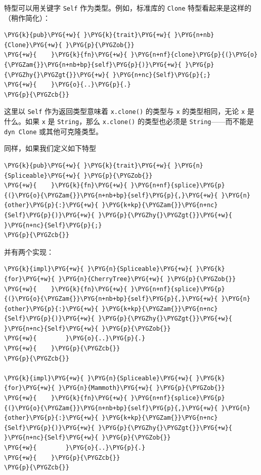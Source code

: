 特型可以用关键字 \texttt{Self} 作为类型。例如，标准库的 \texttt{Clone} 特型看起来是这样的（稍作简化）：

\begin{Verbatim}[commandchars=\\\{\},breaklines=true,breakanywhere=true,fontsize=\codefont,xleftmargin=17bp]
\PYG{k}{pub}\PYG{+w}{ }\PYG{k}{trait}\PYG{+w}{ }\PYG{n+nb}{Clone}\PYG{+w}{ }\PYG{p}{\PYGZob{}}
\PYG{+w}{    }\PYG{k}{fn}\PYG{+w}{ }\PYG{n+nf}{clone}\PYG{p}{(}\PYG{o}{\PYGZam{}}\PYG{n+nb+bp}{self}\PYG{p}{)}\PYG{+w}{ }\PYG{p}{\PYGZhy{}\PYGZgt{}}\PYG{+w}{ }\PYG{n+nc}{Self}\PYG{p}{;}
\PYG{+w}{    }\PYG{o}{..}\PYG{p}{.}
\PYG{p}{\PYGZcb{}}
\end{Verbatim}

这里以 \texttt{Self} 作为返回类型意味着 \texttt{x.clone()} 的类型与 \texttt{x} 的类型相同，无论 \texttt{x} 是什么。如果 \texttt{x} 是 \texttt{String}，那么 \texttt{x.clone()} 的类型也必须是 \texttt{String}——而不能是 \texttt{dyn Clone} 或其他可克隆类型。

同样，如果我们定义如下特型

\begin{Verbatim}[commandchars=\\\{\},breaklines=true,breakanywhere=true,fontsize=\codefont,xleftmargin=17bp]
\PYG{k}{pub}\PYG{+w}{ }\PYG{k}{trait}\PYG{+w}{ }\PYG{n}{Spliceable}\PYG{+w}{ }\PYG{p}{\PYGZob{}}
\PYG{+w}{    }\PYG{k}{fn}\PYG{+w}{ }\PYG{n+nf}{splice}\PYG{p}{(}\PYG{o}{\PYGZam{}}\PYG{n+nb+bp}{self}\PYG{p}{,}\PYG{+w}{ }\PYG{n}{other}\PYG{p}{:}\PYG{+w}{ }\PYG{k+kp}{\PYGZam{}}\PYG{n+nc}{Self}\PYG{p}{)}\PYG{+w}{ }\PYG{p}{\PYGZhy{}\PYGZgt{}}\PYG{+w}{ }\PYG{n+nc}{Self}\PYG{p}{;}
\PYG{p}{\PYGZcb{}}
\end{Verbatim}

并有两个实现：

\begin{Verbatim}[commandchars=\\\{\},breaklines=true,breakanywhere=true,fontsize=\codefont,xleftmargin=17bp]
\PYG{k}{impl}\PYG{+w}{ }\PYG{n}{Spliceable}\PYG{+w}{ }\PYG{k}{for}\PYG{+w}{ }\PYG{n}{CherryTree}\PYG{+w}{ }\PYG{p}{\PYGZob{}}
\PYG{+w}{    }\PYG{k}{fn}\PYG{+w}{ }\PYG{n+nf}{splice}\PYG{p}{(}\PYG{o}{\PYGZam{}}\PYG{n+nb+bp}{self}\PYG{p}{,}\PYG{+w}{ }\PYG{n}{other}\PYG{p}{:}\PYG{+w}{ }\PYG{k+kp}{\PYGZam{}}\PYG{n+nc}{Self}\PYG{p}{)}\PYG{+w}{ }\PYG{p}{\PYGZhy{}\PYGZgt{}}\PYG{+w}{ }\PYG{n+nc}{Self}\PYG{+w}{ }\PYG{p}{\PYGZob{}}
\PYG{+w}{        }\PYG{o}{..}\PYG{p}{.}
\PYG{+w}{    }\PYG{p}{\PYGZcb{}}
\PYG{p}{\PYGZcb{}}

\PYG{k}{impl}\PYG{+w}{ }\PYG{n}{Spliceable}\PYG{+w}{ }\PYG{k}{for}\PYG{+w}{ }\PYG{n}{Mammoth}\PYG{+w}{ }\PYG{p}{\PYGZob{}}
\PYG{+w}{    }\PYG{k}{fn}\PYG{+w}{ }\PYG{n+nf}{splice}\PYG{p}{(}\PYG{o}{\PYGZam{}}\PYG{n+nb+bp}{self}\PYG{p}{,}\PYG{+w}{ }\PYG{n}{other}\PYG{p}{:}\PYG{+w}{ }\PYG{k+kp}{\PYGZam{}}\PYG{n+nc}{Self}\PYG{p}{)}\PYG{+w}{ }\PYG{p}{\PYGZhy{}\PYGZgt{}}\PYG{+w}{ }\PYG{n+nc}{Self}\PYG{+w}{ }\PYG{p}{\PYGZob{}}
\PYG{+w}{        }\PYG{o}{..}\PYG{p}{.}
\PYG{+w}{    }\PYG{p}{\PYGZcb{}}
\PYG{p}{\PYGZcb{}}
\end{Verbatim}

